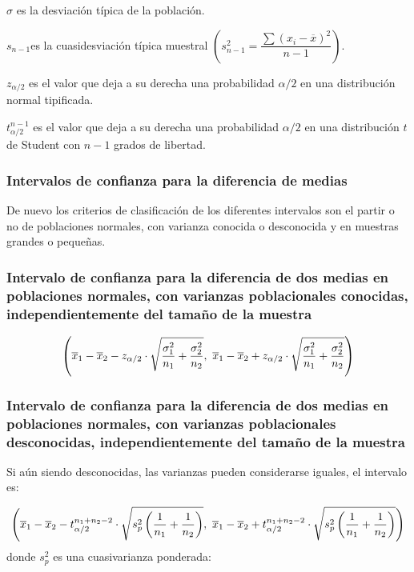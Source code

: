 \documentclass[a4paper]{article}
\begin{document}
$\sigma $ es la desviación típica de la población.

$s_{n-1}$es la cuasidesviación típica muestral $\left( s_{n-1}^{2}=%
\dfrac{\sum \left( x_{i}-\overline{x}\right) ^{2}}{n-1}\right) $.

$z_{\alpha /2}$ es el valor que deja a su derecha una probabilidad
$\alpha /2 $ en una distribución normal tipificada.

$t_{\alpha /2}^{n-1}$ es el valor que deja a su derecha una probabilidad $%
\alpha /2$ en una distribución $t$ de Student con $n-1$ grados
de libertad.

\subsubsection {Intervalos de confianza para la diferencia de
medias}

De nuevo los criterios de clasificación de los diferentes
intervalos son el partir o no de poblaciones normales, con
varianza conocida o desconocida y en muestras grandes o pequeñas.

\subsubsection* {Intervalo de confianza para la diferencia de dos
medias en poblaciones normales, con varianzas poblacionales
conocidas, independientemente del tamaño de la muestra}

\[
\left( \overline{x}_{1}-\overline{x}_{2}-z_{\alpha /2}\cdot \sqrt{\dfrac{%
\sigma _{1}^{2}}{n_{1}}+\dfrac{\sigma _{2}^{2}}{n_{2}}},\ \overline{x}_{1}-%
\overline{x}_{2}+z_{\alpha /2}\cdot \sqrt{\dfrac{\sigma _{1}^{2}}{n_{1}}+%
\dfrac{\sigma _{2}^{2}}{n_{2}}}\right)
\]

\subsubsection* {Intervalo de confianza para la diferencia de dos
medias en poblaciones normales, con varianzas poblacionales
desconocidas, independientemente del tamaño de la muestra}


Si aún siendo desconocidas, las varianzas pueden considerarse
iguales, el intervalo es:

\[
\left( \overline{x}_{1}-\overline{x}_{2}-t_{\alpha
/2}^{n_{1}+n_{2}-2}\cdot
\sqrt{s_{p}^{2}\left( \dfrac{1}{n_{1}}+\dfrac{1}{n_{2}}\right) },\ \overline{%
x}_{1}-\overline{x}_{2}+t_{\alpha /2}^{n_{1}+n_{2}-2}\cdot \sqrt{%
s_{p}^{2}\left( \dfrac{1}{n_{1}}+\dfrac{1}{n_{2}}\right) }\right)
\]
donde $s_{p}^{2}$ es una cuasivarianza ponderada:
\end{document}
